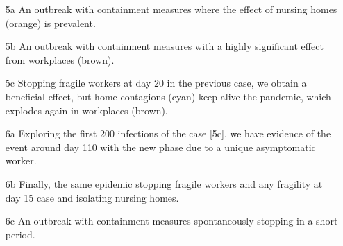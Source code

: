 \documentclass[graybox]{svmult}
\begin{document}
\begin{itemize}
\item [5a] An outbreak with containment measures where the effect of nursing homes (orange) is prevalent.
\item [5b] An outbreak with containment measures with a highly significant effect from workplaces (brown).
\item [5c] Stopping fragile workers at day 20 in the previous case, we obtain a beneficial effect, but home contagions (cyan) keep alive the pandemic, which explodes again in workplaces (brown).

\item [6a] Exploring the first 200 infections of the case [5c], we have evidence of the event around day 110 with the new phase due to a unique asymptomatic worker.
\item [6b] Finally, the same epidemic stopping fragile workers and any fragility at day 15 case and isolating nursing homes.
\item [6c] An outbreak with containment measures spontaneously stopping in a short period.
\end{itemize}
\end{document}

